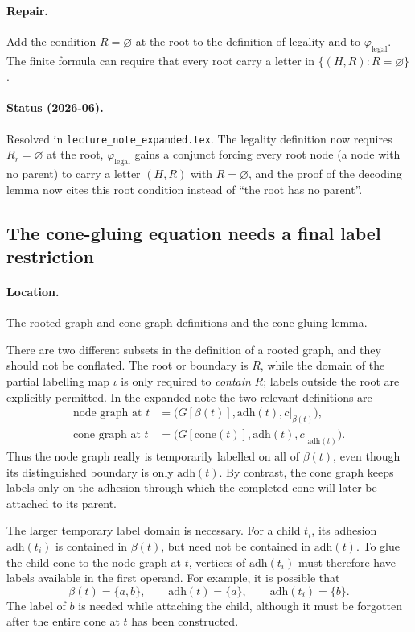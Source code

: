 \documentclass[11pt]{article}
\newcommand{\adh}{\ensuremath{\mathrm{adh}}}
\newcommand{\cone}{\ensuremath{\mathrm{cone}}}
\begin{document}
\paragraph{Repair.} Add the condition \(R=\varnothing\) at the root to the
definition of legality and to \(\varphi_{\mathrm{legal}}\).  The finite formula
can require that every root carry a letter in
\(\{(H,R):R=\varnothing\}\).

\paragraph{Status (2026-06).} Resolved in \texttt{lecture\_note\_expanded.tex}.
The legality definition now requires \(R_r=\varnothing\) at the root,
\(\varphi_{\mathrm{legal}}\) gains a conjunct forcing every root node (a node
with no parent) to carry a letter \((H,R)\) with \(R=\varnothing\), and the proof
of the decoding lemma now cites this root condition instead of ``the root has no
parent''.

\subsection{The cone-gluing equation needs a final label restriction}

\paragraph{Location.} The rooted-graph and cone-graph definitions and the
cone-gluing lemma.

There are two different subsets in the definition of a rooted graph, and they
should not be conflated.  The root or boundary is \(R\), while the domain of the
partial labelling map \(\iota\) is only required to \emph{contain} \(R\); labels
outside the root are explicitly permitted.  In the expanded note the two
relevant definitions are
\[
\begin{aligned}
  \text{node graph at }t
    &=\bigl(G[\beta(t)],\adh(t),c|_{\beta(t)}\bigr),\\
  \text{cone graph at }t
    &=\bigl(G[\cone(t)],\adh(t),c|_{\adh(t)}\bigr).
\end{aligned}
\]
Thus the node graph really is temporarily labelled on all of \(\beta(t)\), even
though its distinguished boundary is only \(\adh(t)\).  By contrast, the cone
graph keeps labels only on the adhesion through which the completed cone will
later be attached to its parent.

The larger temporary label domain is necessary.  For a child \(t_i\), its
adhesion \(\adh(t_i)\) is contained in \(\beta(t)\), but need not be contained in
\(\adh(t)\).  To glue the child cone to the node graph at \(t\), vertices of
\(\adh(t_i)\) must therefore have labels available in the first operand.  For
example, it is possible that
\[
  \beta(t)=\{a,b\},\qquad \adh(t)=\{a\},\qquad
  \adh(t_i)=\{b\}.
\]
The label of \(b\) is needed while attaching the child, although it must be
forgotten after the entire cone at \(t\) has been constructed.
\end{document}

